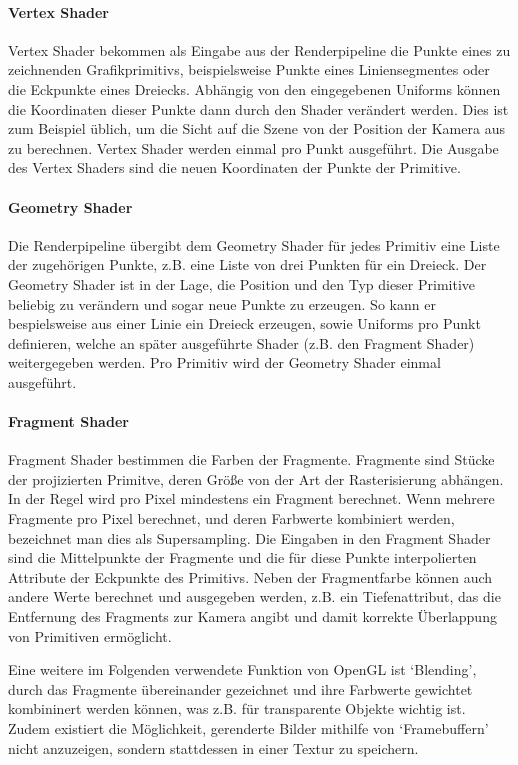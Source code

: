 \documentclass[a4paper,fontsize=12pt,toc=bib,halfparskip]{scrartcl}
\begin{document}
\paragraph{Vertex Shader}
Vertex Shader bekommen als Eingabe aus der Renderpipeline die Punkte eines zu zeichnenden Grafikprimitivs, beispielsweise Punkte eines Liniensegmentes oder die Eckpunkte eines Dreiecks. Abh\"angig von den eingegebenen Uniforms k\"onnen die Koordinaten dieser Punkte dann durch den Shader ver\"andert werden. Dies ist zum Beispiel \"ublich, um die Sicht auf die Szene von der Position der Kamera aus zu berechnen. Vertex Shader werden einmal pro Punkt ausgef\"uhrt. Die Ausgabe des Vertex Shaders sind die neuen Koordinaten der Punkte der Primitive.

\paragraph{Geometry Shader}
Die Renderpipeline \"ubergibt dem Geometry Shader f\"ur jedes Primitiv eine Liste der zugeh\"origen Punkte, z.B. eine Liste von drei Punkten f\"ur ein Dreieck. Der Geometry Shader ist in der Lage, die Position und den Typ dieser Primitive beliebig zu ver\"andern und sogar neue Punkte zu erzeugen. So kann er bespielsweise aus einer Linie ein Dreieck erzeugen, sowie Uniforms pro Punkt definieren, welche an sp\"ater ausgef\"uhrte Shader (z.B. den Fragment Shader) weitergegeben werden. Pro Primitiv wird der Geometry Shader einmal ausgef\"uhrt.

\paragraph{Fragment Shader}
Fragment Shader bestimmen die Farben der Fragmente. Fragmente sind St\"ucke der projizierten Primitve, deren Gr\"o{\ss}e von der Art der Rasterisierung abh\"angen. In der Regel wird pro Pixel mindestens ein Fragment berechnet. Wenn mehrere Fragmente pro Pixel berechnet, und deren Farbwerte kombiniert werden, bezeichnet man dies als Supersampling. Die Eingaben in den Fragment Shader sind die Mittelpunkte der Fragmente und die f\"ur diese Punkte interpolierten Attribute der Eckpunkte des Primitivs. Neben der Fragmentfarbe k\"onnen auch andere Werte berechnet und ausgegeben werden, z.B. ein Tiefenattribut, das die Entfernung des Fragments zur Kamera angibt und damit korrekte \"Uberlappung von Primitiven erm\"oglicht.

Eine weitere im Folgenden verwendete Funktion von OpenGL ist `Blending', durch das Fragmente \"ubereinander gezeichnet und ihre Farbwerte gewichtet kombininert werden k\"onnen, was z.B. f\"ur transparente Objekte wichtig ist. Zudem existiert die M\"oglichkeit, gerenderte Bilder mithilfe von `Framebuffern' nicht anzuzeigen, sondern stattdessen in einer Textur zu speichern.
\end{document}
